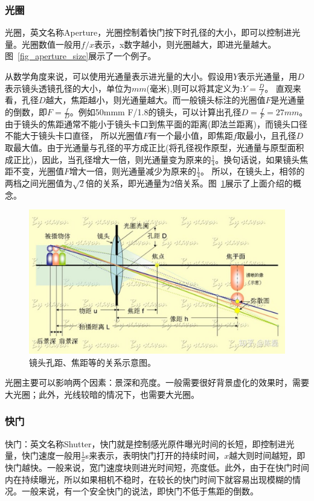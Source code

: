 \documentclass{ctexart}
\begin{document}
\subsubsection{光圈}
光圈，英文名称Aperture，光圈控制着快门按下时孔径的大小，即可以控制进光量。光圈数值一般用${f/x}$表示，x数字越小，则光圈越大，即进光量越大。图~\ref{fig_aperture_size}展示了一个例子。

从数学角度来说，可以使用光通量表示进光量的大小。假设用$Y$表示光通量，用$D$表示镜头透镜孔径的大小，单位为$mm$(毫米),则可以将其定义为:$Y=\frac{D}{f}$。
直观来看，孔径$D$越大，焦距越小，则光通量越大。而一般镜头标注的光圈值$F$是光通量的倒数，即$F=\frac{f}{D}$。例如50mmm F/1.8的镜头，可以计算出孔径$D=\frac{f}{F}=27mm$。
由于镜头的焦距通常不能小于镜头卡口到焦平面的距离(即法兰距离)，而镜头口径不能大于镜头卡口直径， 所以光圈值$F$有一个最小值，即焦距$f$取最小，且孔径$D$取最大值。由于光通量与孔径的平方成正比(将孔径视作原型，光通量与原型面积成正比)，因此，当孔径增大一倍，则光通量变为原来的$\frac{1}{4}$。换句话说，如果镜头焦距不变，光圈值$F$增大一倍，则光通量减少为原来的$\frac{1}{4}$。
所以，在镜头上，相邻的两档之间光圈值为$\sqrt{2}$倍的关系，即光通量为2倍关系。图~\ref{fig_aperture_math}展示了上面介绍的概念。
\begin{figure}[h!]
    \centering
    \includegraphics[width=.8\linewidth]{imgs/aperture_math.jpg}
    \caption{镜头孔距、焦距等的关系示意图。}
    \label{fig_aperture_math}
\end{figure}

光圈主要可以影响两个因素：景深和亮度。一般需要很好背景虚化的效果时，需要大光圈；此外，光线较暗的情况下，也需要大光圈。

\subsubsection{快门}
快门：英文名称Shutter，快门就是控制感光原件曝光时间的长短，即控制进光量，快门速度一般用$\frac{1}{x}$s来表示，表明快门打开的持续时间，$x$越大则时间越短，即快门越快。一般来说，宽门速度块则进光时间短，亮度低。此外，由于在快门时间内在持续曝光，所以如果相机不稳时，在较长的快门时间下就容易出现模糊的情况。一般来说，有一个安全快门的说法，即快门不低于焦距的倒数。
\end{document}

